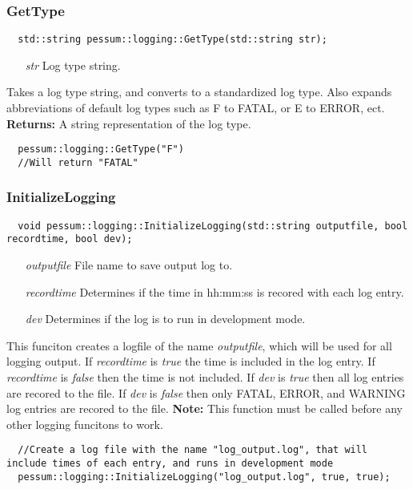 \documentclass{subfiles}
\begin{document}
\subsubsection{GetType}
\begin{lstlisting}
  std::string pessum::logging::GetType(std::string str);
\end{lstlisting}
\begin{enumerate}
	\item[\emph{str}] Log type string.
\end{enumerate}
Takes a log type string, and converts to a standardized log type. Also expands abbreviations of default log types such as F to FATAL, or E to ERROR, ect.\\
\textbf{Returns:} A string representation of the log type.
\begin{lstlisting}
  pessum::logging::GetType("F")
  //Will return "FATAL"
\end{lstlisting}
\newpage
\subsubsection{InitializeLogging}
\begin{lstlisting}
  void pessum::logging::InitializeLogging(std::string outputfile, bool recordtime, bool dev);
\end{lstlisting}
\begin{enumerate}
	\item[\emph{outputfile}] File name to save output log to.
	\item[\emph{recordtime}] Determines if the time in hh:mm:ss is recored with each log entry.
	\item[\emph{dev}] Determines if the log is to run in development mode.
\end{enumerate}
This funciton creates a logfile of the name \emph{outputfile}, which will be used for all logging output. If \emph{recordtime} is \emph{true} the time is included in the log entry. If \emph{recordtime} is \emph{false} then the time is not included. If \emph{dev} is \emph{true} then all log entries are recored to the file. If \emph{dev} is \emph{false} then only FATAL, ERROR, and WARNING log entries are recored to the file. \textbf{Note:} This function must be called before any other logging funcitons to work.
\begin{lstlisting}
  //Create a log file with the name "log_output.log", that will include times of each entry, and runs in development mode
  pessum::logging::InitializeLogging("log_output.log", true, true);
\end{lstlisting}
\newpage
\end{document}
